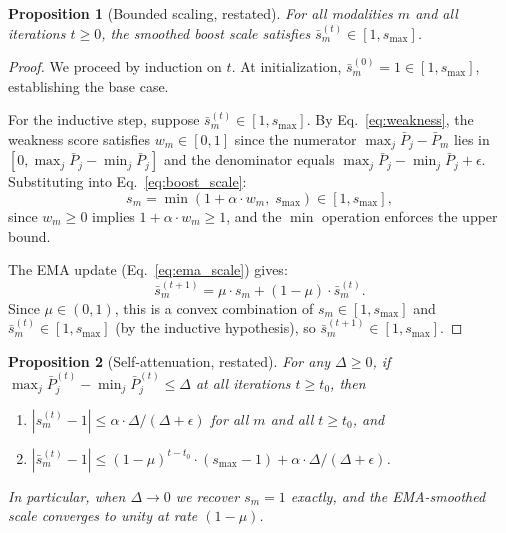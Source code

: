 \documentclass{article}
\newtheorem{proposition}{Proposition}
\begin{document}
\begin{proposition}[Bounded scaling, restated]
For all modalities $m$ and all iterations $t \geq 0$, the smoothed boost scale satisfies $\bar{s}_m^{(t)} \in [1, s_{\max}]$.
\end{proposition}

\begin{proof}
We proceed by induction on $t$. At initialization, $\bar{s}_m^{(0)} = 1 \in [1, s_{\max}]$, establishing the base case.

For the inductive step, suppose $\bar{s}_m^{(t)} \in [1, s_{\max}]$. By Eq.~\eqref{eq:weakness}, the weakness score satisfies $w_m \in [0, 1]$ since the numerator $\max_j \bar{P}_j - \bar{P}_m$ lies in $[0, \max_j \bar{P}_j - \min_j \bar{P}_j]$ and the denominator equals $\max_j \bar{P}_j - \min_j \bar{P}_j + \epsilon$. Substituting into Eq.~\eqref{eq:boost_scale}:
%
\begin{equation*}
s_m = \min(1 + \alpha \cdot w_m,\; s_{\max}) \in [1, s_{\max}],
\end{equation*}
%
since $w_m \geq 0$ implies $1 + \alpha \cdot w_m \geq 1$, and the $\min$ operation enforces the upper bound.

The EMA update (Eq.~\eqref{eq:ema_scale}) gives:
%
\begin{equation*}
\bar{s}_m^{(t+1)} = \mu \cdot s_m + (1 - \mu) \cdot \bar{s}_m^{(t)}.
\end{equation*}
%
Since $\mu \in (0, 1)$, this is a convex combination of $s_m \in [1, s_{\max}]$ and $\bar{s}_m^{(t)} \in [1, s_{\max}]$ (by the inductive hypothesis), so $\bar{s}_m^{(t+1)} \in [1, s_{\max}]$.
\end{proof}


\begin{proposition}[Self-attenuation, restated]
For any $\Delta \geq 0$, if $\max_j \bar{P}_j^{(t)} - \min_j \bar{P}_j^{(t)} \leq \Delta$ at all iterations $t \geq t_0$, then
\begin{enumerate}
    \item $|s_m^{(t)} - 1| \leq \alpha \cdot \Delta / (\Delta + \epsilon)$ for all $m$ and all $t \geq t_0$, and
    \item $|\bar{s}_m^{(t)} - 1| \leq (1 - \mu)^{t - t_0} \cdot (s_{\max} - 1) + \alpha \cdot \Delta / (\Delta + \epsilon)$.
\end{enumerate}
In particular, when $\Delta \to 0$ we recover $s_m = 1$ exactly, and the EMA-smoothed scale converges to unity at rate $(1-\mu)$.
\end{proposition}
\end{document}
